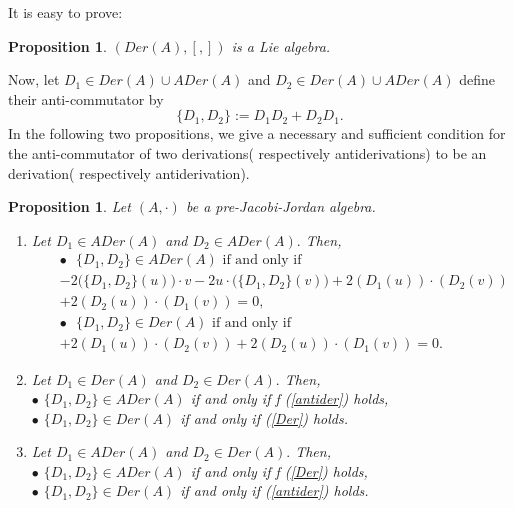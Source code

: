 \documentclass[12pt]{amsart}
\newtheorem{proposition}[Theorem]{Proposition}
\begin{document}
	It is easy to prove:
	\begin{proposition}
		$(Der(A),[,])$ is a Lie algebra.
	\end{proposition}
	Now, let $D_1\in Der(A)\cup ADer(A)$ and $D_2\in Der(A)\cup ADer(A)$ define their anti-commutator by
	$$\{D_1,D_2\}:=D_1D_2+D_2D_1.$$
	In the following two propositions, we give a necessary and sufficient condition for the anti-commutator of two derivations( respectively antiderivations) to be an derivation( respectively antiderivation).
	\begin{proposition} \label{antantid}
		Let $(A,\cdot)$ be a pre-Jacobi-Jordan algebra.
		\begin{enumerate}
			\item  Let $D_1\in ADer(A)$ and $D_2\in ADer(A).$ Then,
			\begin{eqnarray}
				&&	\mbox{$\bullet$ $\{D_1,D_2\}\in ADer(A)$ if and only if}\nonumber\\ &&-2\bigg(\{D_{1},D_{2}\}(u)\bigg)\cdot v-2u\cdot\bigg(\{D_{1},D_{2}\}(v)\bigg)+2(D_{1}(u))\cdot(D_{2}(v))\nonumber\\
				&&+2(D_{2}(u))\cdot(D_{1}(v))=0,\label{antider}\\
				&&	\mbox{$\bullet$ $\{D_1,D_2\}\in Der(A)$ if and only if}\nonumber\\
				&& +2(D_{1}(u))\cdot(D_{2}(v))+2(D_{2}(u))\cdot(D_{1}(v))=0 \label{Der}.
			\end{eqnarray}
			\item Let $D_1\in Der(A)$ and $D_2\in Der(A).$ Then,\\
			$\bullet$ $\{D_1,D_2\}\in ADer(A)$ if and only if f (\ref{antider}) holds,\\
			$\bullet$ $\{D_1,D_2\}\in Der(A)$ if and only if (\ref{Der}) holds.\\
			\item Let $D_1\in ADer(A)$ and $D_2\in Der(A).$ Then,\\
			$\bullet$ $\{D_1,D_2\}\in ADer(A)$ if and only if f (\ref{Der}) holds,\\
			$\bullet$ $\{D_1,D_2\}\in Der(A)$ if and only if (\ref{antider}) holds.\\
		\end{enumerate}
	\end{proposition}
\end{document}
